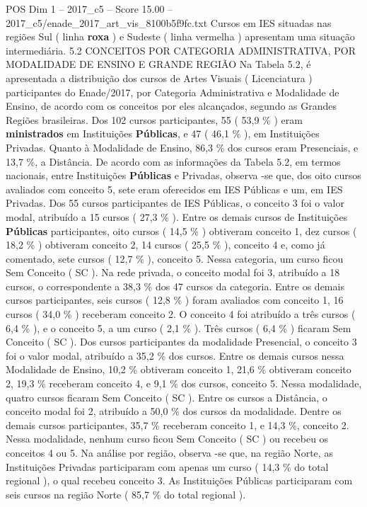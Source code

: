 \begin{textsample}{POS Dim 1 – 2017\_c5 – Score 15.00 – 2017\_c5/enade\_2017\_art\_vis\_8100b5f9fc.txt}
Cursos em IES situadas nas regiões Sul ( linha \textbf{roxa} ) e Sudeste ( linha vermelha ) apresentam uma situação intermediária. 5.2 CONCEITOS POR CATEGORIA ADMINISTRATIVA, POR MODALIDADE DE ENSINO E GRANDE REGIÃO Na Tabela 5.2, é apresentada a distribuição dos cursos de Artes Visuais ( Licenciatura ) participantes do Enade/2017, por Categoria Administrativa e Modalidade de Ensino, de acordo com os conceitos por eles alcançados, segundo as Grandes Regiões brasileiras.
Dos 102 cursos participantes, 55 ( 53,9 \% ) eram \textbf{ministrados} em Instituições \textbf{Públicas}, e 47 ( 46,1 \% ), em Instituições Privadas.
Quanto à Modalidade de Ensino, 86,3 \% dos cursos eram Presenciais, e 13,7 \%, a Distância.
De acordo com as informações da Tabela 5.2, em termos nacionais, entre Instituições \textbf{Públicas} e Privadas, observa -se que, dos oito cursos avaliados com conceito 5, sete eram oferecidos em IES Públicas e um, em IES Privadas.
Dos 55 cursos participantes de IES Públicas, o conceito 3 foi o valor modal, atribuído a 15 cursos ( 27,3 \% ).
Entre os demais cursos de Instituições \textbf{Públicas} participantes, oito cursos ( 14,5 \% ) obtiveram conceito 1, dez cursos ( 18,2 \% ) obtiveram conceito 2, 14 cursos ( 25,5 \% ), conceito 4 e, como já comentado, sete cursos ( 12,7 \% ), conceito 5.
Nessa categoria, um curso ficou Sem Conceito ( SC ).
Na rede privada, o conceito modal foi 3, atribuído a 18 cursos, o correspondente a 38,3 \% dos 47 cursos da categoria.
Entre os demais cursos participantes, seis cursos ( 12,8 \% ) foram avaliados com conceito 1, 16 cursos ( 34,0 \% ) receberam conceito 2.
O conceito 4 foi atribuído a três cursos ( 6,4 \% ), e o conceito 5, a um curso ( 2,1 \% ).
Três cursos ( 6,4 \% ) ficaram Sem Conceito ( SC ).
Dos cursos participantes da modalidade Presencial, o conceito 3 foi o valor modal, atribuído a 35,2 \% dos cursos.
Entre os demais cursos nessa Modalidade de Ensino, 10,2 \% obtiveram conceito 1, 21,6 \% obtiveram conceito 2, 19,3 \% receberam conceito 4, e 9,1 \% dos cursos, conceito 5.
Nessa modalidade, quatro cursos ficaram Sem Conceito ( SC ).
Entre os cursos a Distância, o conceito modal foi 2, atribuído a 50,0 \% dos cursos da modalidade.
Dentre os demais cursos participantes, 35,7 \% receberam conceito 1, e 14,3 \%, conceito 2.
Nessa modalidade, nenhum curso ficou Sem Conceito ( SC ) ou recebeu os conceitos 4 ou 5.
Na análise por região, observa -se que, na região Norte, as Instituições Privadas participaram com apenas um curso ( 14,3 \% do total regional ), o qual recebeu conceito 3.
As Instituições Públicas participaram com seis cursos na região Norte ( 85,7 \% do total regional ).

\end{textsample}

